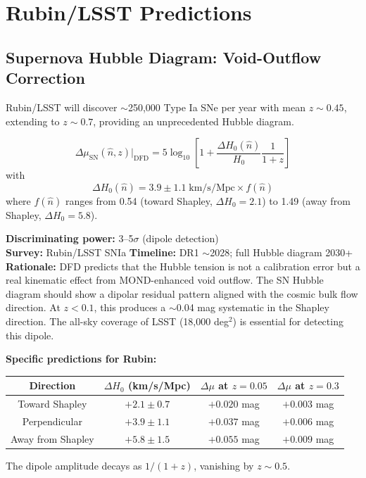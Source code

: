 \documentclass[12pt]{article}
\begin{document}
\section{Rubin/LSST Predictions}
\label{sec:rubin}

\subsection{Supernova Hubble Diagram: Void-Outflow Correction}

Rubin/LSST will discover $\sim$250,000 Type Ia SNe per year with mean $z \sim 0.45$, extending to $z \sim 0.7$, providing an unprecedented Hubble diagram.

\begin{predbox}
\begin{equation}
\boxed{
\Delta\mu_\mathrm{SN}(\hat{n},z) \bigg|_\mathrm{DFD} = 5\log_{10}\left[1 + \frac{\Delta H_0(\hat{n})}{H_0}\frac{1}{1+z}\right]
}
\end{equation}
with
\begin{equation}
\Delta H_0(\hat{n}) = 3.9 \pm 1.1\;\text{km/s/Mpc} \times f(\hat{n})
\end{equation}
where $f(\hat{n})$ ranges from 0.54 (toward Shapley, $\Delta H_0 = 2.1$) to 1.49 (away from Shapley, $\Delta H_0 = 5.8$).

\medskip\noindent
\textbf{Discriminating power:} 3--5$\sigma$ (dipole detection)\\
\textbf{Survey:} Rubin/LSST SNIa \quad\textbf{Timeline:} DR1 $\sim$2028; full Hubble diagram 2030+\\
\textbf{Rationale:} DFD predicts that the Hubble tension is not a calibration error but a real kinematic effect from MOND-enhanced void outflow. The SN Hubble diagram should show a dipolar residual pattern aligned with the cosmic bulk flow direction. At $z < 0.1$, this produces a $\sim$0.04 mag systematic in the Shapley direction. The all-sky coverage of LSST (18,000 deg$^2$) is essential for detecting this dipole.

\medskip\noindent
\textbf{Specific predictions for Rubin:}
\begin{center}
\begin{tabular}{cccc}
\toprule
Direction & $\Delta H_0$ (km/s/Mpc) & $\Delta\mu$ at $z=0.05$ & $\Delta\mu$ at $z=0.3$ \\
\midrule
Toward Shapley & $+2.1 \pm 0.7$ & $+0.020$ mag & $+0.003$ mag \\
Perpendicular & $+3.9 \pm 1.1$ & $+0.037$ mag & $+0.006$ mag \\
Away from Shapley & $+5.8 \pm 1.5$ & $+0.055$ mag & $+0.009$ mag \\
\bottomrule
\end{tabular}
\end{center}
The dipole amplitude decays as $1/(1+z)$, vanishing by $z \sim 0.5$.
\end{predbox}
\end{document}

